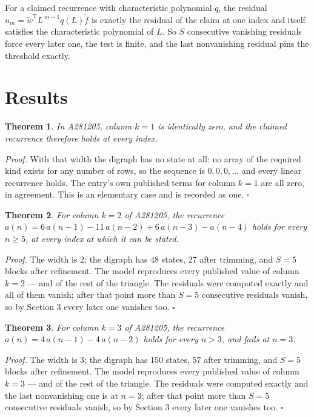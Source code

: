 \documentclass[11pt]{article}
\newtheorem{theorem}{Theorem}
\theoremstyle{definition}
\begin{document}
For a claimed recurrence with characteristic polynomial $q$, the residual $u_m = \tilde w^{\mathsf T}L^{\,m-1}q(L)\tilde f$ is exactly the residual of the claim at one index and itself satisfies the characteristic polynomial of $L$. So $S$ consecutive vanishing residuals force every later one, the test is finite, and the last nonvanishing residual pins the threshold exactly.

\section{Results}

\begin{theorem} In A281205, column $k = 1$ is identically zero, and the claimed recurrence therefore holds at every index.\end{theorem}

{\itshape Proof.} With that width the digraph has no state at all: no array of the required kind exists for any number of rows, so the sequence is $0,0,0,\dots$ and every linear recurrence holds. The entry's own published terms for column $k = 1$ are all zero, in agreement. This is an elementary case and is recorded as one. $\square$

\begin{theorem} For column $k = 2$ of A281205, the recurrence $a(n) = 6\,a(n-1) - 11\,a(n-2) + 6\,a(n-3) - a(n-4)$ holds for every $n \ge 5$, at every index at which it can be stated.\end{theorem}

{\itshape Proof.} The width is $2$; the digraph has $48$ states, $27$ after trimming, and $S = 5$ blocks after refinement. The model reproduces every published value of column $k = 2$ --- and of the rest of the triangle. The residuals were computed exactly and all of them vanish; after that point more than $S = 5$ consecutive residuals vanish, so by Section 3 every later one vanishes too. $\square$

\begin{theorem} For column $k = 3$ of A281205, the recurrence $a(n) = 4\,a(n-1) - 4\,a(n-2)$ holds for every $n > 3$, and fails at $n = 3$.\end{theorem}

{\itshape Proof.} The width is $3$; the digraph has $150$ states, $57$ after trimming, and $S = 5$ blocks after refinement. The model reproduces every published value of column $k = 3$ --- and of the rest of the triangle. The residuals were computed exactly and the last nonvanishing one is at $n = 3$; after that point more than $S = 5$ consecutive residuals vanish, so by Section 3 every later one vanishes too. $\square$
\end{document}
